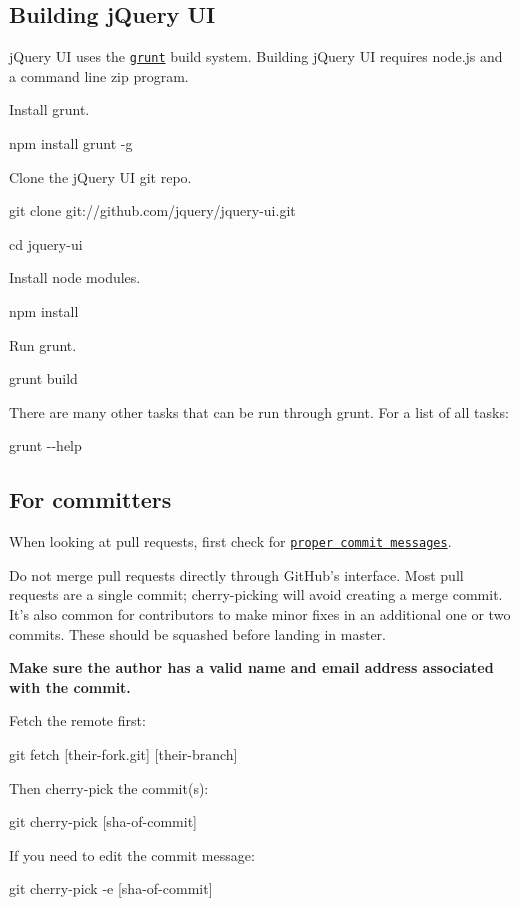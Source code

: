 \subsection*{Building j\-Query U\-I }

j\-Query U\-I uses the \href{http://github.com/cowboy/grunt}{\tt grunt} build system. Building j\-Query U\-I requires node.\-js and a command line zip program.

Install grunt.

{\ttfamily npm install grunt -\/g}

Clone the j\-Query U\-I git repo.

{\ttfamily git clone git\-://github.com/jquery/jquery-\/ui.\-git}

{\ttfamily cd jquery-\/ui}

Install node modules.

{\ttfamily npm install}

Run grunt.

{\ttfamily grunt build}

There are many other tasks that can be run through grunt. For a list of all tasks\-:

{\ttfamily grunt -\/-\/help}

\subsection*{For committers }

When looking at pull requests, first check for \href{http://wiki.jqueryui.com/w/page/12137724/Bug-Fixing-Guide}{\tt proper commit messages}.

Do not merge pull requests directly through Git\-Hub's interface. Most pull requests are a single commit; cherry-\/picking will avoid creating a merge commit. It's also common for contributors to make minor fixes in an additional one or two commits. These should be squashed before landing in master.

{\bfseries Make sure the author has a valid name and email address associated with the commit.}

Fetch the remote first\-: \begin{DoxyVerb}git fetch [their-fork.git] [their-branch]
\end{DoxyVerb}


Then cherry-\/pick the commit(s)\-: \begin{DoxyVerb}git cherry-pick [sha-of-commit]
\end{DoxyVerb}


If you need to edit the commit message\-: \begin{DoxyVerb}git cherry-pick -e [sha-of-commit]
\end{DoxyVerb}


